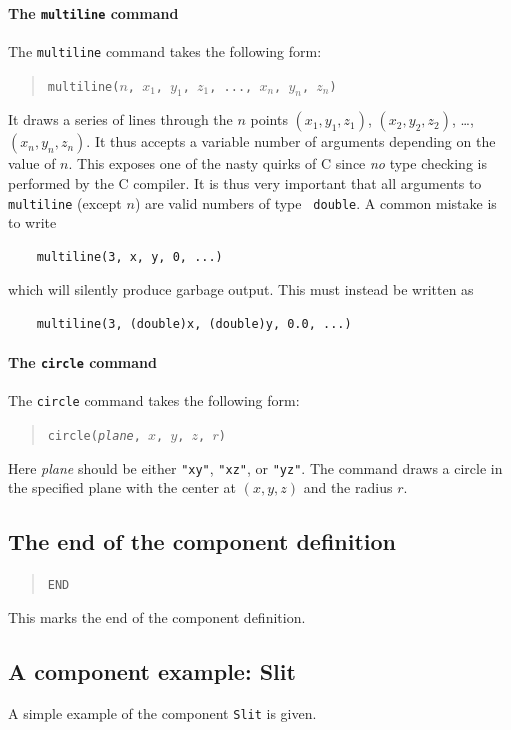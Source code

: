 {\paragraph{The {\tt multiline} command}

The {\tt multiline} command takes the following form:
\begin{quote}
  \texttt{multiline($n$, $x_1$, $y_1$, $z_1$, ..., $x_n$, $y_n$, $z_n$)}
\end{quote}
It draws a series of lines through the $n$ points $(x_1, y_1, z_1)$,
$(x_2, y_2, z_2)$, \ldots, $(x_n, y_n, z_n)$. It thus accepts a variable
number of arguments depending on the value of $n$. This exposes 
one of the nasty quirks of C since \emph{no} type checking is
performed by the C compiler. It is thus very important that all
arguments to {\tt multiline} (except $n$) are valid numbers of type {\tt
  double}. A common mistake is to write
\begin{verbatim}
    multiline(3, x, y, 0, ...)
\end{verbatim}
which will silently produce garbage output. This must instead be
written as
\begin{verbatim}
    multiline(3, (double)x, (double)y, 0.0, ...)
\end{verbatim}


\paragraph{The {\tt circle} command}

The {\tt circle} command takes the following form:
\begin{quote}
  \texttt{circle({\it plane}, $x$, $y$, $z$, $r$)}
\end{quote}
Here {\it plane} should be either \verb+"xy"+, \verb+"xz"+, or
\verb+"yz"+. The command draws a circle in the specified plane with the center
 at $(x, y, z)$ and the radius $r$.



\subsection{The end of the component definition}

\begin{quote}
  \texttt{END}
\end{quote}
This marks the end of the component definition.

\subsection{A component example: Slit}
\label{s:slit}
A simple example of the component \texttt{Slit} is given.

}
